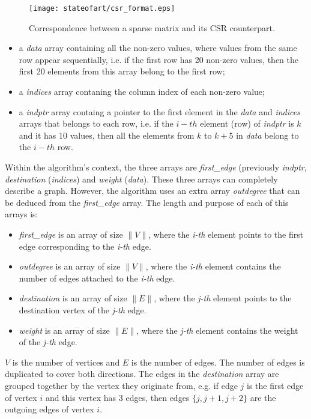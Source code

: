 \begin{figure}[hbtp]
\centering
\texttt{[image: stateofart/csr\_format.eps]}
\caption{Correspondence between a sparse matrix and its CSR counterpart.}
\label{fig:csr}
\end{figure}

\begin{itemize}
	\item a \emph{data} array containing all the non-zero values, where values from the same row appear sequentially, i.e. if the first row has 20 non-zero values, then the first 20 elements from this array belong to the first row;
	\item a \emph{indices} array contaning the column index of each non-zero value;
	\item a \emph{indptr} array containg a pointer to the first element in the \emph{data} and \emph{indices} arrays that belongs to each row, i.e. if the $i-th$ element (row) of \emph{indptr} is $k$ and it has 10 values, then all the elements from $k$ to $k + 5$ in \emph{data} belong to the $i-th$ row.
\end{itemize}

Within the algorithm's context, the three arrays are \emph{first\_edge} (previously \emph{indptr}, \emph{destination} (\emph{indices}) and \emph{weight} (\emph{data}). These three arrays can completely describe a graph. However, the algorithm uses an extra array \emph{outdegree} that can be deduced from the \emph{first\_edge} array. The length and purpose of each of this arrays is:
\begin{itemize}
	\item \emph{first\_edge} is an array of size $\|V\|$, where the \emph{i-th} element points to the first edge corresponding to the \emph{i-th} edge.
	\item \emph{outdegree} is an array of size $\|V\|$, where the \emph{i-th} element contains the number of edges attached to the \emph{i-th} edge.
	\item \emph{destination} is an array of size $\|E\|$, where the \emph{j-th} element points to the destination vertex of the \emph{j-th} edge.
	\item \emph{weight} is an array of size $\|E\|$, where the \emph{j-th} element contains the weight of the \emph{j-th} edge.
\end{itemize}

$V$ is the number of vertices and $E$ is the number of edges. The number of edges is duplicated to cover both directions. The edges in the \emph{destination} array are grouped together by the vertex they originate from, e.g. if edge $j$ is the first edge of vertex $i$ and this vertex has 3 edges, then edges $\{j,j+1,j+2\}$ are the outgoing edges of vertex $i$.




